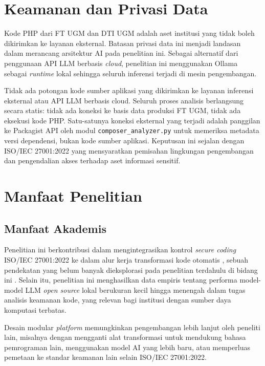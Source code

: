 \section{Keamanan dan Privasi Data}
\label{sec:data-privacy}

Kode PHP dari FT UGM dan DTI UGM adalah aset institusi yang tidak
boleh dikirimkan ke layanan eksternal. Batasan privasi data ini menjadi landasan dalam merancang arsitektur AI pada penelitian ini. Sebagai alternatif dari penggunaan API LLM berbasis \textit{cloud}, penelitian ini menggunakan Ollama sebagai \textit{runtime} lokal sehingga seluruh inferensi terjadi di mesin pengembangan.

Tidak ada potongan kode sumber aplikasi yang dikirimkan ke
layanan inferensi eksternal atau API LLM berbasis cloud.
Seluruh proses analisis berlangsung secara statis: tidak ada koneksi
ke basis data produksi FT UGM, tidak ada eksekusi kode PHP.
Satu-satunya koneksi eksternal yang terjadi adalah panggilan ke
Packagist API oleh modul \texttt{composer\_analyzer.py} untuk
memeriksa metadata versi dependensi, bukan kode sumber aplikasi.
Keputusan ini sejalan dengan ISO/IEC 27001:2022
yang mensyaratkan pemisahan lingkungan pengembangan dan pengendalian
akses terhadap aset informasi sensitif.

\section{Manfaat Penelitian}

\subsection{Manfaat Akademis}

Penelitian ini berkontribusi dalam mengintegrasikan kontrol \textit{secure coding} ISO/IEC 27001:2022 ke dalam alur kerja transformasi kode otomatis \cite{iso27001_2022}, sebuah pendekatan yang belum banyak dieksplorasi pada penelitian terdahulu di bidang ini \cite{merlo2007automated}\cite{akuthota2023vulnerability}\cite{stumpfle2025llm}. Selain itu, penelitian ini menghasilkan data empiris tentang performa model-model LLM \textit{open source} lokal berukuran kecil hingga menengah dalam tugas analisis keamanan kode, yang relevan bagi institusi dengan sumber daya komputasi terbatas.

Desain modular \textit{platform} memungkinkan pengembangan lebih lanjut oleh peneliti lain, misalnya dengan mengganti alat transformasi untuk mendukung bahasa pemrograman lain, menggunakan model AI yang lebih baru, atau memperluas pemetaan ke standar keamanan lain selain ISO/IEC 27001:2022.

